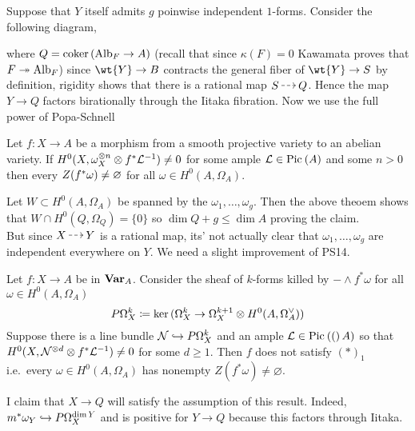 \documentclass[12pt]{article}
\begin{document}
Suppose that $Y$ itself admits $g$ poinwise independent $1$-forms. Consider the following diagram,

\begin{center}
\end{center}
where $Q = \operatorname{\mathrm{coker}}{(\mathrm{Alb}_F \to A)}$ (recall that since $\kappa(F) = 0$ Kawamata proves that $F \twoheadrightarrow \mathrm{Alb}_F$)
since $\wt{Y} \to B$ contracts the general fiber of $\wt{Y} \to S$ by definition, rigidity shows that there is a rational map $S \rat Q$. Hence the map $Y \to Q$ factors birationally through the Iitaka fibration. Now we use the full power of Popa-Schnell

\begin{theorem}[PS '14]
Let $f : X \to A$ be a morphism from a smooth projective variety to an abelian variety. If $H^0(X, \omega_X^{\otimes n} \otimes f^* \mathcal{L}^{-1} ) \neq 0$ for some ample $\mathcal{L} \in \mathrm{Pic}^{} \left( A \right)$ and some $n > 0$ then every $Z(f^* \omega) \neq \varnothing$ for all $\omega \in H^0(A, \Omega_A)$.
\end{theorem}

Let $W \subset H^0(A, \Omega_A)$ be spanned by the $\omega_1, \dots, \omega_g$. Then the above theoem shows that $W \cap H^0(Q, \Omega_Q) = \{ 0 \}$ so $\dim{Q} + g \le \dim{A}$ proving the claim.
\bigskip\\
But since $X \rat Y$ is a rational map, its' not actually clear that $\omega_1, \dots, \omega_g$ are independent everywhere on $Y$. We need a slight improvement of PS14.

\newcommand{\cN}{\mathcal{N}}

\begin{theorem} \label{thm:generalization_of_PS14}
Let $f : X \to A$ be in $\mathbf{Var}_A$. Consider the sheaf of $k$-forms killed by $-\wedge f^* \omega$ for all $\omega \in H^0(A, \Omega_A)$
\[ P\Omega_X^k \coloneq \ker{(\Omega_X^k \to \Omega_X^{k+1} \otimes H^0(A, \Omega_A^{\vee}))}  \]
Suppose there is a line bundle $\cN \embed P\Omega_X^k$ and an ample $\mathcal{L} \in \mathrm{Pic}^{} \left( ( \right)A)$ so that $H^0(X, \cN^{\ot d} \ot f^* \L^{-1}) \neq 0$ for some $d \ge 1$. Then $f$ does not satisfy $(\ast)_1$ i.e.\ every $\omega \in H^0(A, \Omega_A)$ has nonempty $Z(f^* \omega) \neq \varnothing$.
\end{theorem}

I claim that $X \to Q$ will satisfy the assumption of this result. Indeed, $m^* \omega_Y \hookrightarrow P \Omega^{\dim{Y}}_X$ and is positive for $Y \to Q$ because this factors through Iitaka. 
\end{document}
